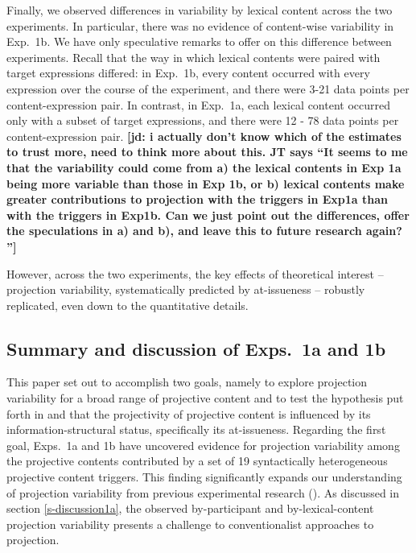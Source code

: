 \documentclass[11pt,fleqn]{article}
\newcommand{\6}{\mbox{$[\hspace*{-.6mm}[$}}
\newcommand{\9}{\mbox{$]\hspace*{-.6mm}]$}}
\newcommand{\jd}[1]{\textbf{\color{Green}[jd: #1]}}
\begin{document}
Finally, we observed differences in variability by lexical content across the two experiments. In particular, there was no evidence of content-wise variability in Exp.~1b. We have only speculative remarks to offer on this difference between experiments. Recall that the way in which lexical contents were paired with target expressions differed: in Exp.~1b, every content occurred with every expression over the course of the experiment, and there were 3-21 data points per content-expression pair. In contrast, in Exp.~1a, each lexical content occurred only with a subset of target expressions, and there were 12 - 78 data points per content-expression pair.
 \jd{i actually don't know which of the estimates to trust more, need to think more about this. JT says ``It seems to me that the variability could come from	a) the lexical contents in Exp 1a being more variable than those in Exp 1b, or	b) lexical contents make greater contributions to projection with the triggers in Exp1a than with the triggers in Exp1b. Can we just point out the differences, offer the speculations in a) and b), and leave this to future research again?
''}

However, across the two experiments, the key effects of theoretical interest -- projection variability, systematically predicted by at-issueness -- robustly replicated, even down to the quantitative details.

\subsection{Summary and discussion of Exps.~1a and 1b}


This paper set out to accomplish two goals, namely to explore projection variability for a broad range of projective content and to test the hypothesis put forth in \citealt{brst-salt10} and \citealt{brst-ar} that the projectivity of projective content is influenced by its information-structural status, specifically its at-issueness. Regarding the first goal, Exps.~1a and 1b have uncovered evidence for projection variability among the projective contents contributed by a set of 19 syntactically heterogeneous projective content triggers. This finding significantly expands our understanding of projection variability from previous experimental research (\citealt{xue-onea11,smith-hall11}). As discussed in section \ref{s-discussion1a}, the observed by-participant and by-lexical-content projection variability presents a challenge to conventionalist approaches to projection. 
\end{document}

